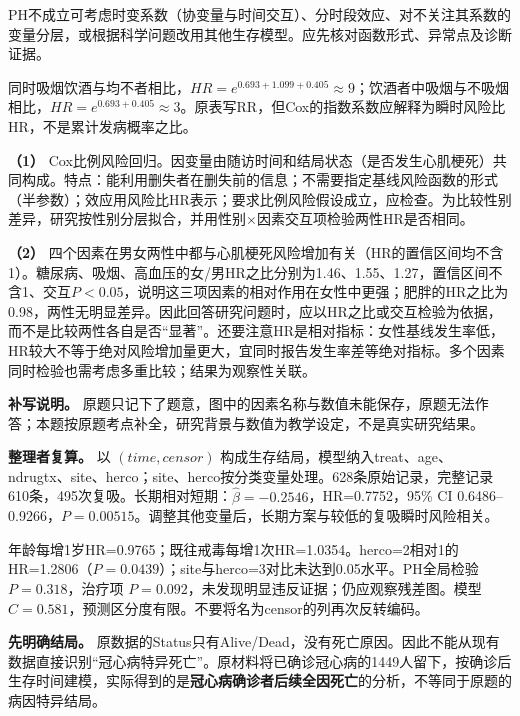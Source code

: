 PH不成立可考虑时变系数（协变量与时间交互）、分时段效应、对不关注其系数的变量分层，或根据科学问题改用其他生存模型。应先核对函数形式、异常点及诊断证据。

同时吸烟饮酒与均不者相比，\(HR=e^{0.693+1.099+0.405}\approx9\)；饮酒者中吸烟与不吸烟相比，\(HR=e^{0.693+0.405}\approx3\)。原表写RR，但Cox的指数系数应解释为瞬时风险比HR，不是累计发病概率之比。



\textbf{（1）} Cox比例风险回归。因变量由随访时间和结局状态（是否发生心肌梗死）共同构成。特点：能利用删失者在删失前的信息；不需要指定基线风险函数的形式（半参数）；效应用风险比HR表示；要求比例风险假设成立，应检查。为比较性别差异，研究按性别分层拟合，并用性别\(\times\)因素交互项检验两性HR是否相同。

\textbf{（2）} 四个因素在男女两性中都与心肌梗死风险增加有关（HR的置信区间均不含1）。糖尿病、吸烟、高血压的女/男HR之比分别为1.46、1.55、1.27，置信区间不含1、交互\(P<0.05\)，说明这三项因素的相对作用在女性中更强；肥胖的HR之比为0.98，两性无明显差异。因此回答研究问题时，应以HR之比或交互检验为依据，而不是比较两性各自是否``显著''。还要注意HR是相对指标：女性基线发生率低，HR较大不等于绝对风险增加量更大，宜同时报告发生率差等绝对指标。多个因素同时检验也需考虑多重比较；结果为观察性关联。

\textbf{补写说明。} 原题只记下了题意，图中的因素名称与数值未能保存，原题无法作答；本题按原题考点补全，研究背景与数值为教学设定，不是真实研究结果。



\textbf{整理者复算。} 以 \((time,censor)\) 构成生存结局，模型纳入treat、age、ndrugtx、site、herco；site、herco按分类变量处理。628条原始记录，完整记录610条，495次复吸。长期相对短期：\(\hat\beta=-0.2546\)，HR=0.7752，95\% CI 0.6486--0.9266，\(P=0.00515\)。调整其他变量后，长期方案与较低的复吸瞬时风险相关。

年龄每增1岁HR=0.9765；既往戒毒每增1次HR=1.0354。herco=2相对1的HR=1.2806（\(P=0.0439\)）；site与herco=3对比未达到0.05水平。PH全局检验 \(P=0.318\)，治疗项 \(P=0.092\)，未发现明显违反证据；仍应观察残差图。模型 \(C=0.581\)，预测区分度有限。不要将名为censor的列再次反转编码。



\textbf{先明确结局。} 原数据的Status只有Alive/Dead，没有死亡原因。因此不能从现有数据直接识别``冠心病特异死亡''。原材料将已确诊冠心病的1449人留下，按确诊后生存时间建模，实际得到的是\textbf{冠心病确诊者后续全因死亡}的分析，不等同于原题的病因特异结局。

